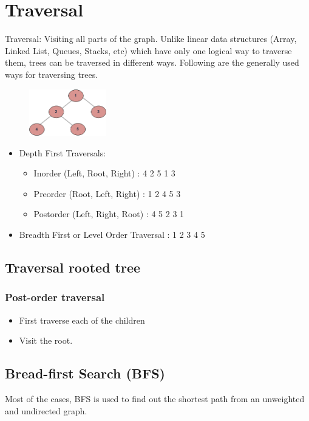 \documentclass[en,hazy,blue,screen,14pt]{elegantnote}
\begin{document}
\section{Traversal}
Traversal: Visiting all parts of the graph. Unlike linear data structures (Array, Linked List, Queues, Stacks, etc) which have only one logical way to traverse them, trees can be traversed in different ways. Following are the generally used ways for traversing trees.

\begin{figure}[H]
\centering
\includegraphics[width=0.3\textwidth]{tree12.png}
\end{figure}

\begin{itemize}
\item Depth First Traversals:
    \begin{itemize}
     \item Inorder (Left, Root, Right) : 4 2 5 1 3
     \item Preorder (Root, Left, Right) : 1 2 4 5 3
     \item Postorder (Left, Right, Root) : 4 5 2 3 1
    \end{itemize}
\item Breadth First or Level Order Traversal : 1 2 3 4 5

\end{itemize}

\subsection{Traversal rooted tree}
\subsubsection{Post-order traversal}
\begin{itemize}
\item First traverse each of the children 
\item Visit the root.
\end{itemize}
\subsection{Bread-first Search (BFS)}
Most of the cases, BFS is used to find out the shortest path from an unweighted 
and undirected graph.
\end{document}
